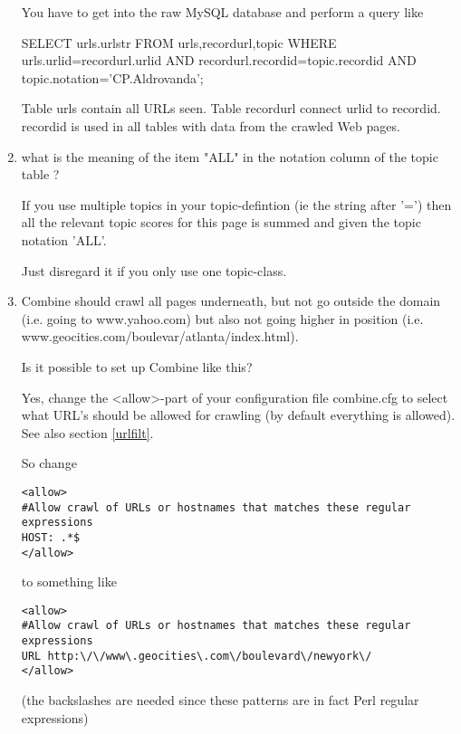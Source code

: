 \begin{enumerate}
You have to get into the raw MySQL database and perform a query like

SELECT urls.urlstr FROM urls,recordurl,topic WHERE urls.urlid=recordurl.urlid AND
recordurl.recordid=topic.recordid AND topic.notation='CP.Aldrovanda';

Table urls contain all URLs seen.
Table recordurl connect urlid to recordid.
recordid is used in all tables with data from the crawled Web pages.

\item
what is the meaning of the item "ALL"  in the notation column of the topic table ?

If you use multiple topics in your topic-defintion
(ie the string after '=') then all the relevant topic scores for this page is summed
and given the topic notation 'ALL'.

Just disregard it if you only use one topic-class.

\item
Combine should crawl all pages underneath, but not go outside
the domain (i.e. going to www.yahoo.com) but also not
going higher in position (i.e.
www.geocities.com/boulevar/atlanta/index.html).

Is it possible to set up Combine like this?

Yes, change the <allow>-part of your configuration file combine.cfg
to select what URL's should be allowed for crawling (by default everything
is allowed). See also section \ref{urlfilt}.

So change\\
\begin{verbatim}
<allow>
#Allow crawl of URLs or hostnames that matches these regular expressions
HOST: .*$
</allow>
\end{verbatim}
to something like

\begin{verbatim}
<allow>
#Allow crawl of URLs or hostnames that matches these regular expressions
URL http:\/\/www\.geocities\.com\/boulevard\/newyork\/
</allow>
\end{verbatim}

(the backslashes are needed since these patterns are in fact Perl regular expressions)

\end{enumerate}
